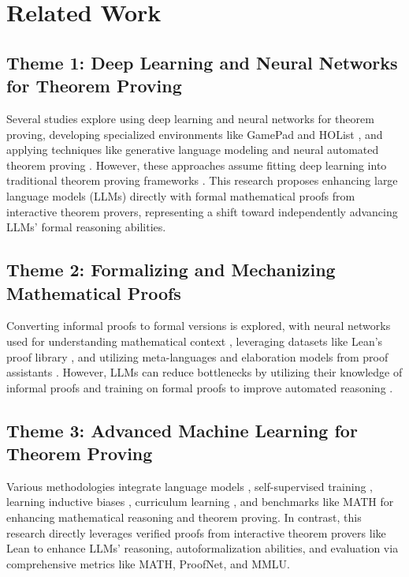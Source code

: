 \section{Related Work}

\subsection{Theme 1: Deep Learning and Neural Networks for Theorem Proving}

Several studies explore using deep learning and neural networks for theorem proving, developing specialized environments like GamePad and HOList \cite{huang2019gamepad} \cite{bansal2019holist}, and applying techniques like generative language modeling and neural automated theorem proving \cite{polu2020generative} \cite{jiang2023draft}. However, these approaches assume fitting deep learning into traditional theorem proving frameworks \cite{li2021isarstep}. This research proposes enhancing large language models (LLMs) directly with formal mathematical proofs from interactive theorem provers, representing a shift toward independently advancing LLMs' formal reasoning abilities.

\subsection{Theme 2: Formalizing and Mechanizing Mathematical Proofs}

Converting informal proofs to formal versions is explored, with neural networks used for understanding mathematical context \cite{wu2022autoformalization}, leveraging datasets like Lean's proof library \cite{yang2023leandojo}, and utilizing meta-languages \cite{jiang2022thor} and elaboration models from proof assistants \cite{szegedy2020promising}. However, LLMs can reduce bottlenecks by utilizing their knowledge of informal proofs \cite{azerbayev2023llemma} and training on formal proofs to improve automated reasoning \cite{zheng2022minif2f}.

\subsection{Theme 3: Advanced Machine Learning for Theorem Proving}

Various methodologies integrate language models \cite{han2022proof}, self-supervised training \cite{wu2022autoformalization_arxiv}, learning inductive biases \cite{zheng2022minif2f}, curriculum learning \cite{polu2022formal}, and benchmarks like MATH \cite{hendrycks2021measuring} for enhancing mathematical reasoning and theorem proving. In contrast, this research directly leverages verified proofs from interactive theorem provers like Lean to enhance LLMs' reasoning, autoformalization abilities, and evaluation via comprehensive metrics like MATH, ProofNet, and MMLU.
